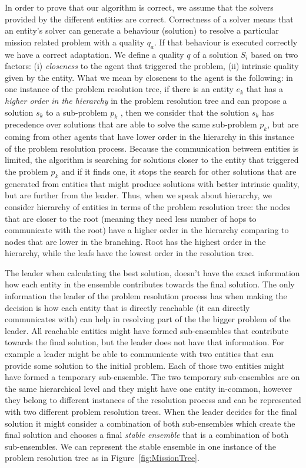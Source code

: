 \documentclass[journal]{IEEEtran}
\theoremstyle{definition}
\begin{document}
In order to prove that our algorithm is correct, we assume that the solvers provided by the different entities are correct. 
Correctness of a solver means that an entity's solver can generate a behaviour (solution) to resolve a particular mission related problem with a quality $q_a$. If that behaviour is executed correctly we have a correct adaptation.
We define a quality $q$ of a solution  $S_i$  based on two factors: (i) \textit{closeness} to the agent that triggered the problem, (ii) intrinsic quality given by the entity.
What we mean by closeness to the agent is the following: in one instance of the problem resolution tree, if there is an entity $e_k$ that has a \textit{higher order in the hierarchy} in the problem resolution tree 
and can propose a solution $s_k$ to a sub-problem $p_k$ , then we consider that the solution $s_k$ has precedence over solutions that are able to solve the same sub-problem $p_k$, but are coming from other agents that have lower order in the hierarchy in this instance of the problem resolution process.  
Because the communication between entities is limited, the algorithm is searching for solutions closer to the entity that triggered the problem $p_k$ and if it finds one, it stops the search for other solutions that are generated from entities that might produce solutions with better intrinsic quality, but are further from the leader. Thus, when we speak about hierarchy, we consider hierarchy of entities in terms of the problem resolution tree: the nodes that are closer to the root (meaning they need less number of hops to communicate with the root) have a higher order in the hierarchy comparing to nodes that are lower in the branching. Root has the highest order in the hierarchy, while the leafs have the lowest order in the resolution tree.

The leader when calculating the best solution, doesn't have the exact information how each entity in the ensemble contributes towards the final solution. The only information the leader of the problem resolution process has when making the decision is how each entity that is directly reachable (it can directly communicates with) can help in resolving part of the the bigger problem of the leader. All reachable entities might have formed sub-ensembles that contribute towards the final solution, but the leader does not have that information.
For example a leader might be able to communicate with two entities that can provide some solution to the initial problem. Each of those two entities might have formed a temporary sub-ensemble. 
The two temporary sub-ensembles are on the same hierarchical level and they might have one entity in-common, however they belong to different instances of the resolution process and can be represented with two different problem resolution trees. When the leader decides for the final solution it might consider a combination of both sub-ensembles which create the final solution and chooses a final \textit{stable ensemble} that is a combination of both sub-ensembles. We can represent the stable ensemble in one instance of the problem resolution tree as in Figure~\ref{fig:MissionTree}.
\end{document}
